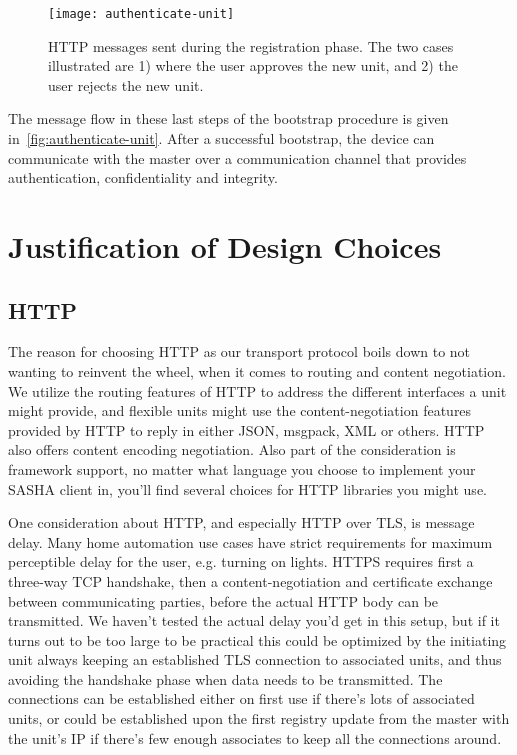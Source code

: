 \begin{figure}[ht!]
    \centering
    \texttt{[image: authenticate-unit]}
    \caption{HTTP messages sent during the registration phase. The two cases illustrated are 1) where the user approves the new unit, and 2) the user rejects the new unit.}
    \label{fig:authenticate-unit}
\end{figure}

The message flow in these last steps of the bootstrap procedure is given in~\autoref{fig:authenticate-unit}. After a successful bootstrap, the device can communicate with the master over a communication channel that provides authentication, confidentiality and integrity.


\section{Justification of Design Choices}

\subsection{HTTP}
The reason for choosing HTTP as our transport protocol boils down to not wanting to reinvent the wheel, when it comes to routing and content negotiation. We utilize the routing features of HTTP to address the different interfaces a unit might provide, and flexible units might use the content-negotiation features provided by HTTP to reply in either JSON, msgpack, XML or others. HTTP also offers content encoding negotiation. Also part of the consideration is framework support, no matter what language you choose to implement your SASHA client in, you'll find several choices for HTTP libraries you might use.

One consideration about HTTP, and especially HTTP over TLS, is message delay. Many home automation use cases have strict requirements for maximum perceptible delay for the user, e.g. turning on lights. HTTPS requires first a three-way TCP handshake, then a content-negotiation and certificate exchange between communicating parties, before the actual HTTP body can be transmitted. We haven't tested the actual delay you'd get in this setup, but if it turns out to be too large to be practical this could be optimized by the initiating unit always keeping an established TLS connection to associated units, and thus avoiding the handshake phase when data needs to be transmitted. The connections can be established either on first use if there's lots of associated units, or could be established upon the first registry update from the master with the unit's IP if there's few enough associates to keep all the connections around.

